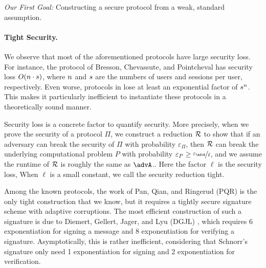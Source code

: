 \begin{displayquote}
	\emph{Our First Goal:} Constructing a secure \introGAKE protocol from a weak, standard assumption.
\end{displayquote} 


\paragraph{Tight Security.}
We observe that most of the aforementioned protocols have large security loss. For instance, the protocol of Bresson, Chevassute, and Pointcheval \cite{EC:BreChePoi02} has security loss $O(n \cdot s)$, where $n$ and $s$ are the numbers of users and sessions per user, respectively. Even worse, protocols in \cite{CCS:BCPQ01,CANS:LiYan13} lose at least an exponential factor of $s^{n}$.
This makes it particularly inefficient to instantiate these protocols in a theoretically sound manner.

Security loss is a concrete factor to quantify security. More precisely, when we prove the security of a protocol $\Pi$, we construct a reduction $\mathcal{R}$ to show that if an adversary can break the security of $\Pi$ with probability $\varepsilon_{\Pi}$, then $\mathcal{R}$ can break the underlying computational problem $P$ with probability $\varepsilon_{P} \geq \nicefrac{\varepsilon_{\advA}}{\ell}$, and we assume the runtime of $\mathcal{R}$ is roughly the same as $\advA$.. 
Here the factor $\ell$ is the security loss, 
When $\ell$ is a small constant, we call the security reduction tight. 

Among the known \introGAKE protocols, the work of Pan, Qian, and Ringerud (PQR) \cite{JC:PanQiaRin22} is the only tight construction that we know, but it requires a tightly secure signature scheme with adaptive corruptions. The most efficient construction of such a signature is due to Diemert, Gellert, Jager, and Lyu (DGJL) \cite{PKC:DGJL21}, which 
requires 6 exponentiation for signing a message and 8 exponentiation for verifying a signature. Asymptotically, this is rather inefficient, considering that Schnorr's signature only need 1 exponentiation for signing and 2 exponentiation for verification.

